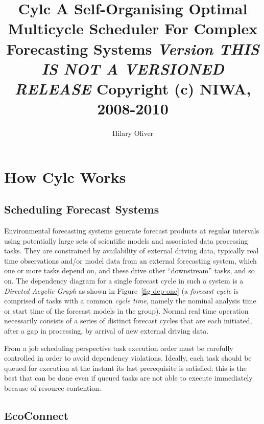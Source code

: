 \documentclass[11pt,a4paper]{article}
\title{Cylc \linebreak 
A Self-Organising Optimal Multicycle Scheduler \linebreak 
For Complex Forecasting Systems \linebreak 
{\em \small Version THIS IS NOT A VERSIONED RELEASE} \linebreak
{\small Copyright (c) NIWA, 2008-2010} }
\author{Hilary Oliver}
\begin{document}
\maketitle

\pagebreak



\pagebreak
\tableofcontents
\listoffigures

\pagebreak
\section{How Cylc Works} 
\label{HowCylcWorks}

\subsection{Scheduling Forecast Systems} 
\label{SchedulingForecastSystems}

Environmental forecasting systems generate forecast products at regular
intervals using potentially large sets of scientific models and
associated data processing tasks. They are constrained by availability
of external driving data, typically real time observations and/or model
data from an external forecasting system, which one or more tasks depend
on, and these drive other ``downstream'' tasks, and so on. The
dependency diagram for a single forecast cycle in such a system 
is a {\em Directed Acyclic Graph} as shown in Figure~\ref{fig-dep-one}
(a {\em forecast cycle} is comprised
of tasks with a common {\em cycle time}, namely the nominal analysis
time or start time of the forecast models in the group). Normal real
time operation necessarily consists of a series of distinct forecast
cycles that are each initiated, after a gap in processing, by arrival of
new external driving data.

From a job scheduling perspective task execution order must be carefully
controlled in order to avoid dependency violations. Ideally, each task
should be queued for execution at the instant its last prerequisite is
satisfied; this is the best that can be done even if queued tasks are
not able to execute immediately because of resource contention.


\subsection{EcoConnect} 
\label{EcoConnect}
\end{document}
